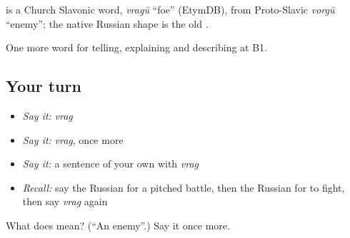 \begin{cousinweb}
\emph{} is a Church Slavonic word, \emph{vragŭ} \textquotedblleft{}foe\textquotedblright{} (EtymDB), from Proto-Slavic \emph{vorgŭ} \textquotedblleft{}enemy\textquotedblright{}; the native Russian shape is the old \emph{}.
\end{cousinweb}

\begin{grammarlens}[title={What you've built}]
One more word for telling, explaining and describing at B1.
\end{grammarlens}

\subsection*{Your turn}
\begin{itemize}
\raggedright
  \item \emph{Say it:} \emph{vrag}
  \item \emph{Say it:} \emph{vrag}, once more
  \item \emph{Say it:} a sentence of your own with \emph{vrag}
  \item \emph{Recall:} say the Russian for a pitched battle, then the Russian for to fight, then say \emph{vrag} again
\end{itemize}

\begin{tcolorbox}[breakable,colback=teal!4,colframe=teal!35!black,title={Before you move on}]
What does  mean? (\textquotedblleft{}An enemy\textquotedblright{}.) Say it once more.
\end{tcolorbox}
